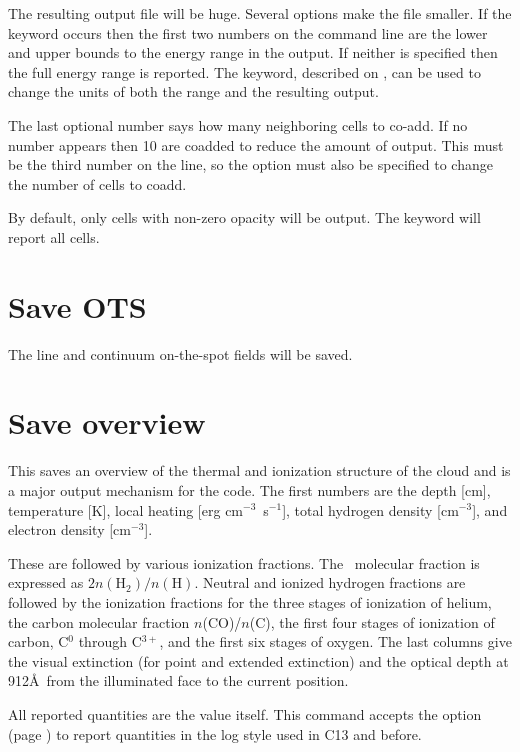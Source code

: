 The resulting output file
will be huge.  Several options make the file smaller.
If the keyword  occurs then the first two numbers on
the command line are the lower and upper bounds to the energy range in the
output.  If neither is specified then the full energy range is reported.
The  keyword, described on \pageref{output_units},
can be used to change the units of both the range and the resulting output.

The last optional number says how many neighboring cells to co-add.  If
no number appears then 10 are coadded to reduce the amount of output.
This must be the third number on the line, so the  option
must also be specified to change the number of cells to coadd.

By default, only cells with non-zero opacity will be output.  
The keyword  will report all cells.

\section{Save OTS}

The line and continuum on-the-spot fields will be saved.

\section{Save overview}

This saves an overview of the thermal and ionization structure
of the cloud and is a major output mechanism for the code.
The first numbers
are the depth [cm], temperature [K], local heating [erg cm$^{-3}$~s$^{-1}$], total
hydrogen density [cm$^{-3}$], and electron density [cm$^{-3}$].

These are followed by various ionization fractions.  
The \htwo\ molecular fraction is expressed as
$2n(\mathrm{H}_2)/n(\mathrm{H})$.
Neutral and ionized hydrogen fractions are followed by the ionization
fractions for the three stages of ionization of helium, the carbon molecular
fraction $n$(CO)/$n$(C), the first four stages of ionization of carbon, 
C$^0$ through C$^{3+}$, and
the first six stages of oxygen.  The last columns give the visual extinction
(for point and extended extinction) and the optical depth at 912\AA\ 
from the illuminated face to the current
position.

All reported quantities are the value itself.
This command accepts the  option 
(page \pageref{sec:SaveLogOption}) to report quantities in the
log style used in C13 and before. 

